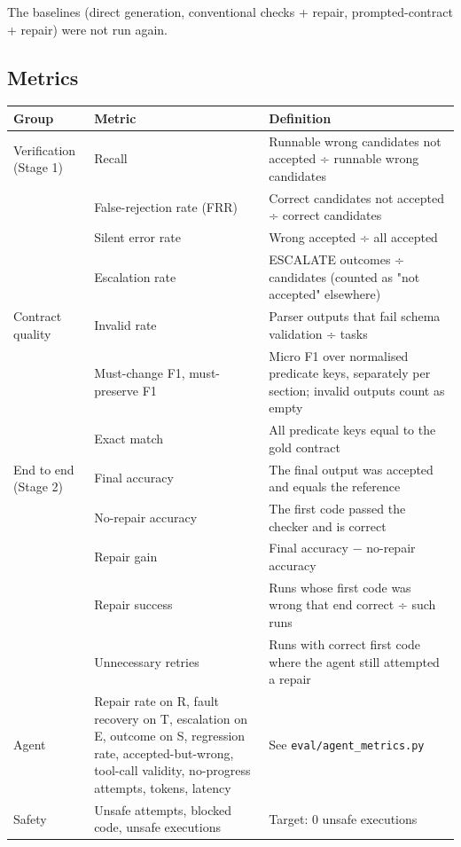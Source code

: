 \documentclass[11pt]{article}
\begin{document}
The baselines (direct generation, conventional checks + repair,
prompted-contract + repair) were not run again.

\subsection{Metrics}

\begin{table}[!tp]
\centering\footnotesize\setlength{\tabcolsep}{3pt}\renewcommand{\arraystretch}{1.1}
\begin{tabularx}{\textwidth}{l>{\raggedright\arraybackslash}X>{\raggedright\arraybackslash}X}
\toprule
\textbf{Group} & \textbf{Metric} & \textbf{Definition} \\
\midrule
Verification (Stage 1) & Recall & Runnable wrong candidates not accepted ÷ runnable wrong candidates \\
 & False-rejection rate (FRR) & Correct candidates not accepted ÷ correct candidates \\
 & Silent error rate & Wrong accepted ÷ all accepted \\
 & Escalation rate & ESCALATE outcomes ÷ candidates (counted as "not accepted" elsewhere) \\
Contract quality & Invalid rate & Parser outputs that fail schema validation ÷ tasks \\
 & Must-change F1, must-preserve F1 & Micro F1 over normalised predicate keys, separately per section; invalid outputs count as empty \\
 & Exact match & All predicate keys equal to the gold contract \\
End to end (Stage 2) & Final accuracy & The final output was accepted and equals the reference \\
 & No-repair accuracy & The first code passed the checker and is correct \\
 & Repair gain & Final accuracy − no-repair accuracy \\
 & Repair success & Runs whose first code was wrong that end correct ÷ such runs \\
 & Unnecessary retries & Runs with correct first code where the agent still attempted a repair \\
Agent & Repair rate on R, fault recovery on T, escalation on E, outcome on S, regression rate, accepted-but-wrong, tool-call validity, no-progress attempts, tokens, latency & See \texttt{eval/\allowbreak{}agent\_\allowbreak{}metrics.\allowbreak{}py} \\
Safety & Unsafe attempts, blocked code, unsafe executions & Target: 0 unsafe executions \\
\bottomrule
\end{tabularx}
\end{table}
\end{document}
